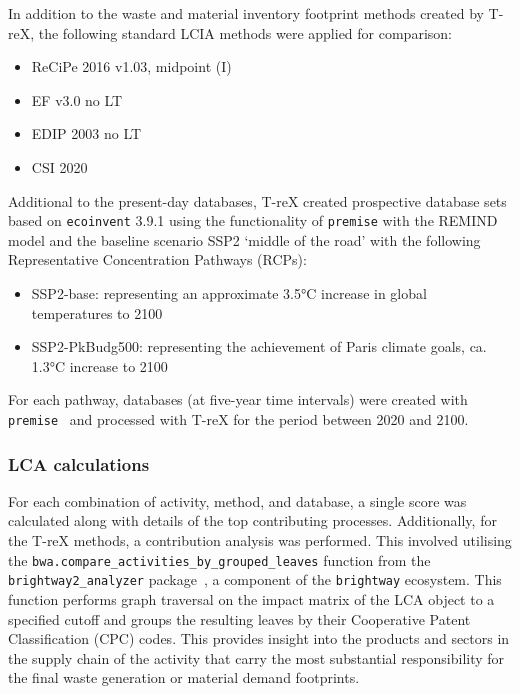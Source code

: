 \documentclass[a4paper,fleqn]{cas-dc}
\begin{document}
In addition to the waste and material inventory footprint methods created by T-reX, the following standard LCIA methods were applied for comparison:

\begin{itemize}[itemsep=0pt]
	\item ReCiPe 2016 v1.03, midpoint (I)~\citep{huijbregts2016recipe}
	\item EF v3.0 no LT~\citep{eu2023ef}
	\item EDIP 2003 no LT~\citep{hauschild2003edip}
	\item CSI 2020~\citep{arvidsson2020csi}
\end{itemize}

Additional to the present-day databases, T-reX created prospective database sets based on \texttt{ecoinvent} 3.9.1 using the functionality of \texttt{premise} with the REMIND model and the baseline scenario SSP2 `middle of the road' with the following Representative Concentration Pathways (RCPs):
\begin{itemize}
	\item SSP2-base: representing an approximate 3.5°C increase in global temperatures to 2100
	\item SSP2-PkBudg500: representing the achievement of Paris climate goals, ca. 1.3°C increase to 2100
\end{itemize}

For each pathway, databases (at five-year time intervals) were created with \texttt{premise}~\citep{sacchi2022premise} and processed with T-reX for the period between 2020 and 2100.

\subsubsection{LCA calculations}
For each combination of activity, method, and database, a single score was calculated along with details of the top contributing processes. Additionally, for the T-reX methods, a contribution analysis was performed. This involved utilising the \texttt{bwa.compare\_activities\_by\_grouped\_leaves} function from the \texttt{brightway2\_analyzer} package~\citep{mutel2016brightway2analyzer}, a component of the \texttt{brightway} ecosystem. This function performs graph traversal on the impact matrix of the LCA object to a specified cutoff and groups the resulting leaves by their Cooperative Patent Classification (CPC) codes. This provides insight into the products and sectors in the supply chain of the activity that carry the most substantial responsibility for the final waste generation or material demand footprints.
\end{document}

